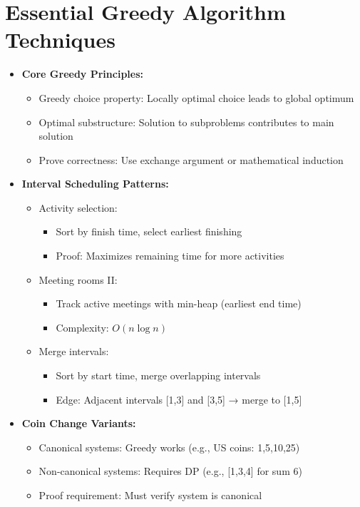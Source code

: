 \documentclass[a4paper,10pt]{book}
\begin{document}
\chapter{Essential Greedy Algorithm Techniques }
\label{sec:greedy}
\begin{itemize}
    \item \textbf{Core Greedy Principles:}
    \begin{itemize}
        \item Greedy choice property: Locally optimal choice leads to global optimum
        \item Optimal substructure: Solution to subproblems contributes to main solution
        \item Prove correctness: Use exchange argument or mathematical induction
    \end{itemize}
    
    \item \textbf{Interval Scheduling Patterns:}
    \begin{itemize}
        \item Activity selection:
        \begin{itemize}
            \item Sort by finish time, select earliest finishing
            \item Proof: Maximizes remaining time for more activities
        \end{itemize}
        \item Meeting rooms II:
        \begin{itemize}
            \item Track active meetings with min-heap (earliest end time)
            \item Complexity: $O(n \log n)$
        \end{itemize}
        \item Merge intervals:
        \begin{itemize}
            \item Sort by start time, merge overlapping intervals
            \item Edge: Adjacent intervals [1,3] and [3,5] → merge to [1,5]
        \end{itemize}
    \end{itemize}
    
    \item \textbf{Coin Change Variants:}
    \begin{itemize}
        \item Canonical systems: Greedy works (e.g., US coins: 1,5,10,25)
        \item Non-canonical systems: Requires DP (e.g., [1,3,4] for sum 6)
        \item Proof requirement: Must verify system is canonical
    \end{itemize}
    

\end{itemize}
\end{document}
